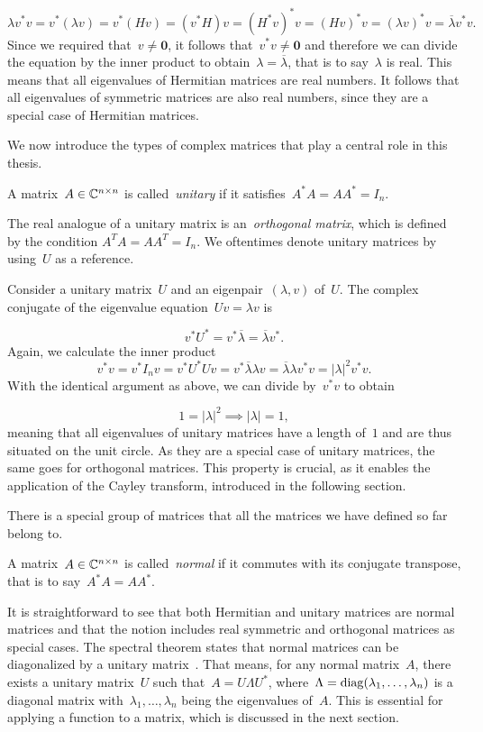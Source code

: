 \[
    \lambda v^* v = v^* \left( \lambda v \right)
    = v^* \left( H v \right)
    = \left(v^* H \right) v
    = \left( H^* v \right)^* v
    = \left( H v \right)^* v
    = (\lambda v)^* v
    = \overline{\lambda} v^* v.
\]
Since we required that~$v \neq \mathbf{0}$, it follows that~$v^* v \neq \mathbf{0}$ and therefore we can divide the equation by the inner product to obtain~$\lambda = \overline{\lambda}$, that is to say~$\lambda$ is real. This means that all eigenvalues of Hermitian matrices are real numbers. It follows that all eigenvalues of symmetric matrices are also real numbers, since they are a special case of Hermitian matrices.

We now introduce the types of complex matrices that play a central role in this thesis.

\begin{definition}
    A matrix~$A \in \mathbb{C}^{n \times n}$ is called~\emph{unitary} if it satisfies~$A^* A = A A^* = I_n$.
\end{definition}
\noindent
The real analogue of a unitary matrix is an~\emph{orthogonal matrix}, which is defined by the condition $A^T A = A A^T = I_n$. We oftentimes denote unitary matrices by using~$U$ as a reference.

Consider a unitary matrix~$U$ and an eigenpair~$(\lambda, v)$ of~$U$. The complex conjugate of the eigenvalue equation~$U v = \lambda v$ is

\[
    v^* U^* = v^* \overline{\lambda} = \overline{\lambda} v^*.
\]
Again, we calculate the inner product
\[
    v^* v = v^* I_n v = v^* U^* U v = v^* \overline{\lambda} \lambda v = \overline{\lambda} \lambda v^* v = \left| \lambda \right|^2 v^* v.
\]
With the identical argument as above, we can divide by~$v^* v$ to obtain

\[
    1 = \left| \lambda \right|^2 \implies \left| \lambda \right| = 1,
\]
meaning that all eigenvalues of unitary matrices have a length of~$1$ and are thus situated on the unit circle. As they are a special case of unitary matrices, the same goes for orthogonal matrices. This property is crucial, as it enables the application of the Cayley transform, introduced in the following section.

There is a special group of matrices that all the matrices we have defined so far belong to.

\begin{definition}
    A matrix~$A \in \mathbb{C}^{n \times n}$ is called~\emph{normal} if it commutes with its conjugate transpose,
    that is to say~$A^* A = A A^*$.
\end{definition}
\noindent
It is straightforward to see that both Hermitian and unitary matrices are normal matrices and that the notion includes real symmetric and orthogonal matrices as special cases. The spectral theorem states that normal matrices can be diagonalized by a unitary matrix~\cite[Thm.~7.24, p.~218]{sheldonaxler}. That means, for any normal matrix~$A$, there exists a unitary matrix~$U$ such that~$A = U \Lambda U^*$, where~$\Lambda = \operatorname{diag}(\lambda_1, \ldots, \lambda_n)$ is a diagonal matrix with~$\lambda_1, \ldots, \lambda_n$ being the eigenvalues of~$A$. This is essential for applying a function to a matrix, which is discussed in the next section.

